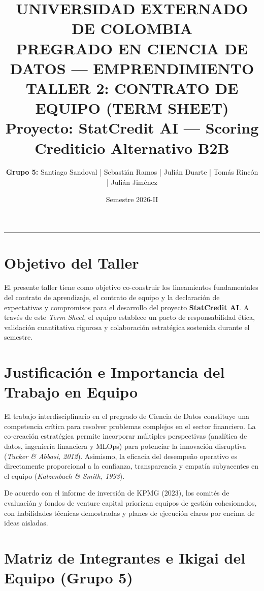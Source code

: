 \documentclass[11pt,a4paper]{article}
\title{
    \vspace{-1cm}
    \textbf{\Large UNIVERSIDAD EXTERNADO DE COLOMBIA}\\
    \textbf{\large PREGRADO EN CIENCIA DE DATOS --- EMPRENDIMIENTO}\\
    \vspace{0.5cm}
    \Large \textbf{TALLER 2: CONTRATO DE EQUIPO (TERM SHEET)}\\
    \large \textbf{Proyecto: StatCredit AI --- Scoring Crediticio Alternativo B2B}
}
\author{\textbf{Grupo 5:} Santiago Sandoval | Sebastián Ramos | Julián Duarte | Tomás Rincón | Julián Jiménez}
\date{Semestre 2026-II}
\begin{document}
\maketitle

\hrule
\vspace{0.5cm}

\section{Objetivo del Taller}
El presente taller tiene como objetivo co-construir los lineamientos fundamentales del contrato de aprendizaje, el contrato de equipo y la declaración de expectativas y compromisos para el desarrollo del proyecto \textbf{StatCredit AI}. A través de este \textit{Term Sheet}, el equipo establece un pacto de responsabilidad ética, validación cuantitativa rigurosa y colaboración estratégica sostenida durante el semestre.

\section{Justificación e Importancia del Trabajo en Equipo}
El trabajo interdisciplinario en el pregrado de Ciencia de Datos constituye una competencia crítica para resolver problemas complejos en el sector financiero. La co-creación estratégica permite incorporar múltiples perspectivas (analítica de datos, ingeniería financiera y MLOps) para potenciar la innovación disruptiva (\textit{Tucker \& Abbasi, 2012}). Asimismo, la eficacia del desempeño operativo es directamente proporcional a la confianza, transparencia y empatía subyacentes en el equipo (\textit{Katzenbach \& Smith, 1993}).

De acuerdo con el informe de inversión de KPMG (2023), los comités de evaluación y fondos de venture capital priorizan equipos de gestión cohesionados, con habilidades técnicas demostradas y planes de ejecución claros por encima de ideas aisladas.

\section{Matriz de Integrantes e Ikigai del Equipo (Grupo 5)}
\end{document}
